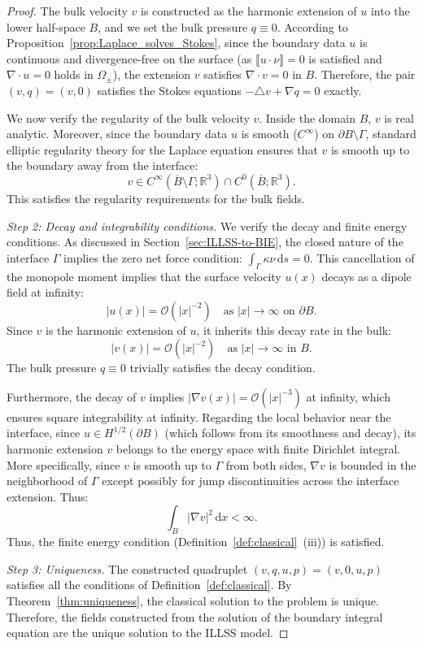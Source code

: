 \documentclass{article}
\theoremstyle{remark}
\theoremstyle{definition}
\numberwithin{equation}{section}
\begin{document}
\begin{proof}
    The bulk velocity $v$ is constructed as the harmonic extension of $u$ into the lower half-space $B$, and we set the bulk pressure $q \equiv 0$.
    According to Proposition~\ref{prop:Laplace_solves_Stokes}, since the boundary data $u$ is continuous and divergence-free on the surface (as $\llbracket u \cdot \nu \rrbracket = 0$ is satisfied and $\nabla \cdot u = 0$ holds in $\Omega_\pm$), the extension $v$ satisfies $\nabla \cdot v = 0$ in $B$.
    Therefore, the pair $(v, q) = (v, 0)$ satisfies the Stokes equations $-\triangle v + \nabla q = 0$ exactly.
    
    We now verify the regularity of the bulk velocity $v$.
    Inside the domain $B$, $v$ is real analytic.
    Moreover, since the boundary data $u$ is smooth ($C^\infty$) on $\partial B \setminus \Gamma$, standard elliptic regularity theory for the Laplace equation ensures that $v$ is smooth up to the boundary away from the interface:
    \[
        v \in C^\infty(\overline{B} \setminus \Gamma; \mathbb{R}^3) \cap C^0(\overline{B}; \mathbb{R}^3).
    \]
    This satisfies the regularity requirements for the bulk fields.

    \textit{Step 2: Decay and integrability conditions.}
    We verify the decay and finite energy conditions.
    As discussed in Section~\ref{sec:ILLSS-to-BIE}, the closed nature of the interface $\Gamma$ implies the zero net force condition: $\int_\Gamma \kappa \nu \,\mathrm{d}s = 0$.
    This cancellation of the monopole moment implies that the surface velocity $u(x)$ decays as a dipole field at infinity:
    \[
        |u(x)| = \mathcal{O}(|x|^{-2}) \quad \text{as } |x| \to \infty \text{ on } \partial B.
    \]
    Since $v$ is the harmonic extension of $u$, it inherits this decay rate in the bulk:
    \[
        |v(x)| = \mathcal{O}(|x|^{-2}) \quad \text{as } |x| \to \infty \text{ in } B.
    \]
    The bulk pressure $q \equiv 0$ trivially satisfies the decay condition.
    
    Furthermore, the decay of $v$ implies $|\nabla v(x)| = \mathcal{O}(|x|^{-3})$ at infinity, which ensures square integrability at infinity.
    Regarding the local behavior near the interface, since $u \in H^{1/2}(\partial B)$ (which follows from its smoothness and decay), its harmonic extension $v$ belongs to the energy space with finite Dirichlet integral.
    More specifically, since $v$ is smooth up to $\Gamma$ from both sides, $\nabla v$ is bounded in the neighborhood of $\Gamma$ except possibly for jump discontinuities across the interface extension. Thus:
    \[
        \int_{B} |\nabla v|^2 \,\mathrm{d}x < \infty.
    \]
    Thus, the finite energy condition (Definition~\ref{def:classical}~(iii)) is satisfied.

    \textit{Step 3: Uniqueness.}
    The constructed quadruplet $(v, q, u, p) = (v, 0, u, p)$ satisfies all the conditions of Definition~\ref{def:classical}.
    By Theorem~\ref{thm:uniqueness}, the classical solution to the problem is unique.
    Therefore, the fields constructed from the solution of the boundary integral equation are the unique solution to the ILLSS model.
\end{proof}
\end{document}

